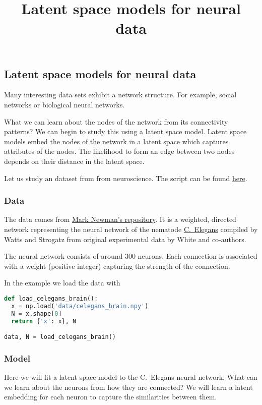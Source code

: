 \title{Latent space models for neural data}

\subsection{Latent space models for neural data}

Many interesting data sets exhibit a network structure. For example, social
networks or biological neural networks.

What we can learn about the nodes of the network from its connectivity patterns?
We can begin to study this using a latent space model.
Latent space models embed the nodes of the network in a latent space which
captures attributes of the nodes. The likelihood to form an edge between two
nodes depends on their distance in the latent space.

Let us study an dataset from from neuroscience.
The script can be found
\href{https://github.com/blei-lab/edward/blob/master/examples/latent_space_model.py}{here}.

\subsubsection{Data}

The data comes from \href{http://www-personal.umich.edu/~mejn/netdata/}{Mark Newman's repository}.
It is a weighted, directed network representing the neural network of
the nematode
\href{https://en.wikipedia.org/wiki/Caenorhabditis_elegans}{C.~Elegans}
compiled by Watts and Strogatz from original experimental data
by White and co-authors.

The neural network consists of around $300$ neurons. Each connection
is associated with a weight (positive integer) capturing the strength
of the connection.

In the example we load the data with
\begin{lstlisting}[language=Python]
def load_celegans_brain():
  x = np.load('data/celegans_brain.npy')
  N = x.shape[0]
  return {'x': x}, N

data, N = load_celegans_brain()
\end{lstlisting}

\subsubsection{Model}

Here we will fit a latent space model to the C.~Elegans neural network. What can
we learn about the neurons from how they are connected? We will learn a latent
embedding for each neuron to capture the similarities between them.


